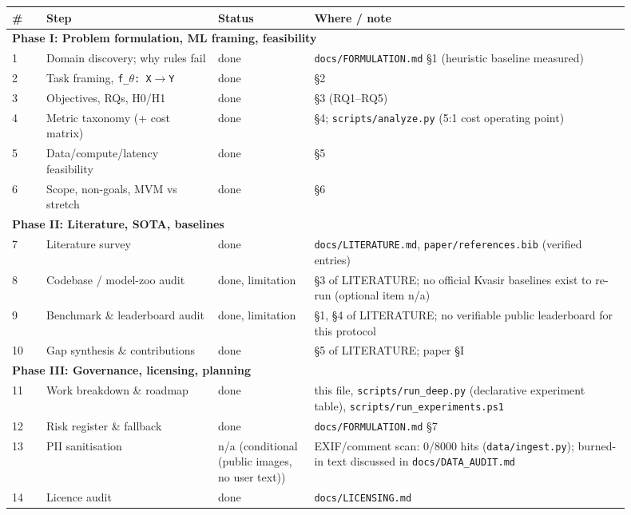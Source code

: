\begin{longtable}{p{0.05\linewidth}p{0.25\linewidth}p{0.14\linewidth}p{0.46\linewidth}}
\toprule \# & Step & Status & Where / note \\ \endhead
\midrule\multicolumn{4}{l}{\textbf{Phase I: Problem formulation, ML framing, feasibility}}\\\midrule
1 & Domain discovery; why rules fail & done & \texttt{docs/FORMULATION.md} \S{}1 (heuristic baseline measured) \\
2 & Task framing, \texttt{f\_\ensuremath{\theta}: X\ensuremath{\rightarrow}Y} & done & \S{}2 \\
3 & Objectives, RQs, H0/H1 & done & \S{}3 (RQ1--RQ5) \\
4 & Metric taxonomy (+ cost matrix) & done & \S{}4; \texttt{scripts/analyze.py} (5:1 cost operating point) \\
5 & Data/compute/latency feasibility & done & \S{}5 \\
6 & Scope, non-goals, MVM vs stretch & done & \S{}6 \\
\midrule\multicolumn{4}{l}{\textbf{Phase II: Literature, SOTA, baselines}}\\\midrule
7 & Literature survey & done & \texttt{docs/LITERATURE.md}, \texttt{paper/references.bib} (verified entries) \\
8 & Codebase / model-zoo audit & done, limitation & \S{}3 of LITERATURE; no official Kvasir baselines exist to re-run (optional item n/a) \\
9 & Benchmark \& leaderboard audit & done, limitation & \S{}1, \S{}4 of LITERATURE; no verifiable public leaderboard for this protocol \\
10 & Gap synthesis \& contributions & done & \S{}5 of LITERATURE; paper \S{}I \\
\midrule\multicolumn{4}{l}{\textbf{Phase III: Governance, licensing, planning}}\\\midrule
11 & Work breakdown \& roadmap & done & this file, \texttt{scripts/run\_deep.py} (declarative experiment table), \texttt{scripts/run\_experiments.ps1} \\
12 & Risk register \& fallback & done & \texttt{docs/FORMULATION.md} \S{}7 \\
13 & PII sanitisation & n/a (conditional (public images, no user text)) & EXIF/comment scan: 0/8000 hits (\texttt{data/ingest.py}); burned-in text discussed in \texttt{docs/DATA\_AUDIT.md} \\
14 & Licence audit & done & \texttt{docs/LICENSING.md} \\

\end{longtable}
